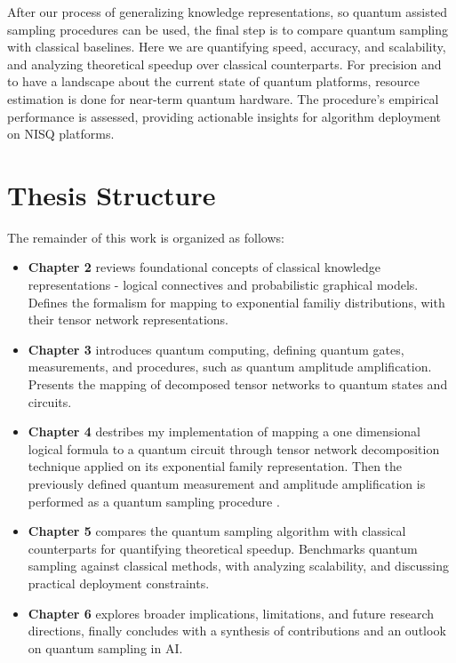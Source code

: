 \documentclass[encoding=utf8,british]{tumphthesis}
\begin{document}
        After our process of generalizing knowledge representations, so quantum assisted sampling procedures can be used, the final step is to
        compare quantum sampling with classical baselines. Here we are quantifying speed, accuracy, and scalability, and analyzing theoretical 
        speedup over classical counterparts. For precision and to have a landscape about the current state of quantum platforms, resource estimation is done
        for near-term quantum hardware. The procedure's empirical performance is assessed, providing actionable insights for algorithm deployment on NISQ platforms.

    \pagebreak

    \section*{Thesis Structure}
    \label{sect:Intro_Structure}
        The remainder of this work is organized as follows:
        \begin{itemize}
            \item \textbf{Chapter 2} reviews foundational concepts of classical knowledge representations - logical connectives and probabilistic graphical models.
            Defines the formalism for mapping to exponential familiy distributions, with their tensor network representations.
            \item \textbf{Chapter 3} introduces quantum computing, defining quantum gates, measurements, and procedures, such as quantum amplitude amplification.
            Presents the mapping of decomposed tensor networks to quantum states and circuits.
            \item \textbf{Chapter 4} destribes my implementation of mapping a one dimensional logical formula to a quantum circuit through tensor network decomposition
            technique applied on its exponential family representation. 
            Then the previously defined quantum measurement and amplitude amplification is performed as a quantum sampling procedure .
            \item \textbf{Chapter 5} compares the quantum sampling algorithm with classical counterparts for quantifying theoretical speedup.
            Benchmarks quantum sampling against classical methods, with analyzing scalability, and discussing practical deployment constraints.
            \item \textbf{Chapter 6} explores broader implications, limitations, and future research directions, finally 
            concludes with a synthesis of contributions and an outlook on quantum sampling in AI.
        \end{itemize}
       
\end{document}
